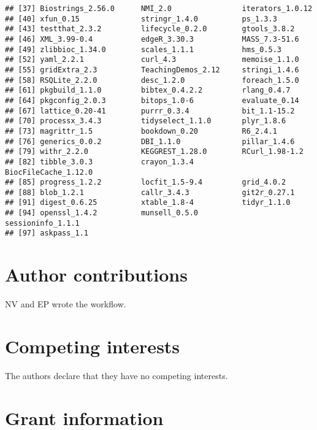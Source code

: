 \documentclass[9pt,a4paper,]{extarticle}
\begin{document}
\begin{verbatim}
## [37] Biostrings_2.56.0      NMI_2.0                iterators_1.0.12      
## [40] xfun_0.15              stringr_1.4.0          ps_1.3.3              
## [43] testthat_2.3.2         lifecycle_0.2.0        gtools_3.8.2          
## [46] XML_3.99-0.4           edgeR_3.30.3           MASS_7.3-51.6         
## [49] zlibbioc_1.34.0        scales_1.1.1           hms_0.5.3             
## [52] yaml_2.2.1             curl_4.3               memoise_1.1.0         
## [55] gridExtra_2.3          TeachingDemos_2.12     stringi_1.4.6         
## [58] RSQLite_2.2.0          desc_1.2.0             foreach_1.5.0         
## [61] pkgbuild_1.1.0         bibtex_0.4.2.2         rlang_0.4.7           
## [64] pkgconfig_2.0.3        bitops_1.0-6           evaluate_0.14         
## [67] lattice_0.20-41        purrr_0.3.4            bit_1.1-15.2          
## [70] processx_3.4.3         tidyselect_1.1.0       plyr_1.8.6            
## [73] magrittr_1.5           bookdown_0.20          R6_2.4.1              
## [76] generics_0.0.2         DBI_1.1.0              pillar_1.4.6          
## [79] withr_2.2.0            KEGGREST_1.28.0        RCurl_1.98-1.2        
## [82] tibble_3.0.3           crayon_1.3.4           BiocFileCache_1.12.0  
## [85] progress_1.2.2         locfit_1.5-9.4         grid_4.0.2            
## [88] blob_1.2.1             callr_3.4.3            git2r_0.27.1          
## [91] digest_0.6.25          xtable_1.8-4           tidyr_1.1.0           
## [94] openssl_1.4.2          munsell_0.5.0          sessioninfo_1.1.1     
## [97] askpass_1.1
\end{verbatim}

\hypertarget{author-contributions}{%
\section{Author contributions}\label{author-contributions}}

NV and EP wrote the workflow.

\hypertarget{competing-interests}{%
\section{Competing interests}\label{competing-interests}}

The authors declare that they have no competing interests.

\hypertarget{grant-information}{%
\section{Grant information}\label{grant-information}}
\end{document}
